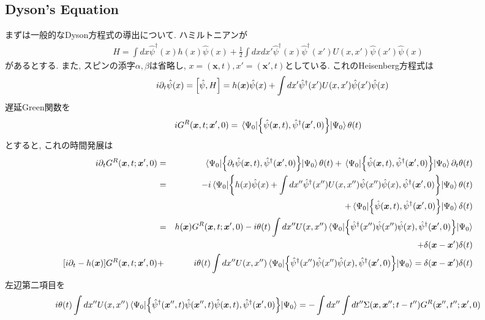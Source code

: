 \documentclass[10.5pt,a4paper]{jreport}
\newcommand{\bx}{\bm{x}}
\newcommand{\hpsi}{\hat{\psi}}
\begin{document}
\subsection{Dyson's Equation}
まずは一般的なDyson方程式の導出について. ハミルトニアンが
\begin{eqnarray}
  H = \int dx\hpsi^\dagger(x) h(x)\hpsi(x) + \frac{1}{2}\int dxdx'\hpsi^\dagger(x)\hpsi^\dagger(x')U(x, x')\hpsi(x')\hpsi(x)
\end{eqnarray}
があるとする. また, スピンの添字$\alpha, \beta$は省略し, $x = (\bx, t), x' = (\bx', t)$としている. これのHeisenberg方程式は
\begin{eqnarray}
 && i\partial_t\hpsi(x) = \qty[\hpsi, H] = h(\bx)\hpsi(x) + \int dx'\hpsi^\dagger(x')U(x, x')\hpsi(x')\hpsi(x)\\
\end{eqnarray}
遅延Green関数を
\begin{eqnarray}
  iG^R(\bx, t; \bx', 0) = \ev{\qty{\hpsi(\bx, t), \hpsi^\dagger(\bx', 0)}}{\Psi_0}\theta(t)
\end{eqnarray}
とすると, これの時間発展は
\begin{eqnarray}
\nonumber  i\partial_tG^R(\bx, t; \bx', 0) &=& \ev{\qty{\partial_t\hpsi(\bx, t), \hpsi^\dagger(\bx', 0)}}{\Psi_0}\theta(t) + \ev{\qty{\hpsi(\bx, t), \hpsi^\dagger(\bx', 0)}}{\Psi_0}\partial_t\theta(t)\\
\nonumber  &=& -i\ev{\qty{h(x)\hpsi(x) + \int dx''\hpsi^\dagger(x'')U(x, x'')\hpsi(x'')\hpsi(x), \hpsi^\dagger(\bx', 0)}}{\Psi_0}\theta(t)\\
\nonumber&& + \ev{\qty{\hpsi(\bx, t), \hpsi^\dagger(\bx', 0)}}{\Psi_0}\delta(t)\\
\nonumber  &=&h(\bx)G^R(\bx, t; \bx', 0) -i\theta(t)\int dx''U(x, x'')\ev{\qty{\hpsi^\dagger(x'')\hpsi(x'')\hpsi(x), \hpsi^\dagger(\bx', 0)}}{\Psi_0}\\
\nonumber&& +\delta(\bx-\bx')\delta(t)\\
\nonumber\qty[i\partial_t -h(\bx)]G^R(\bx, t; \bx', 0) &+&i\theta(t)\int dx''U(x, x'')\ev{\qty{\hpsi^\dagger(x'')\hpsi(x'')\hpsi(x), \hpsi^\dagger(\bx', 0)}}{\Psi_0}  = \delta(\bx-\bx')\delta(t)\\
\end{eqnarray}
左辺第二項目を
\begin{eqnarray}
\nonumber  i\theta(t)\int dx''U(x, x'')\ev{\qty{\hpsi^\dagger(\bx'', t)\hpsi(\bx'', t)\hpsi(\bx, t), \hpsi^\dagger(\bx', 0)}}{\Psi_0} = -\int dx''\int dt''\Sigma(\bx, \bx''; t - t'')G^R(\bx'', t''; \bx', 0)\\
\end{eqnarray}
\end{document}
